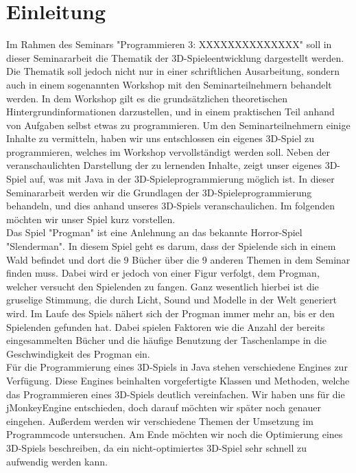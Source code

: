 \chapter{Einleitung}\label{ch:einleitung}
Im Rahmen des Seminars "Programmieren 3: XXXXXXXXXXXXXX" soll in dieser Seminararbeit die Thematik der 3D-Spieleentwicklung dargestellt werden. Die Thematik soll jedoch nicht nur in einer schriftlichen Ausarbeitung, sondern auch in einem sogenannten Workshop mit den Seminarteilnehmern behandelt werden. In dem Workshop gilt es die grundsätzlichen theoretischen Hintergrundinformationen darzustellen, und in einem praktischen Teil anhand von Aufgaben selbst etwas zu programmieren. Um den Seminarteilnehmern einige Inhalte zu vermitteln, haben wir uns entschlossen ein eigenes 3D-Spiel zu programmieren, welches im Workshop vervollständigt werden soll. Neben der veranschaulichten Darstellung der zu lernenden Inhalte, zeigt unser eigenes 3D-Spiel auf, was mit Java in der 3D-Spieleprogrammierung möglich ist. In dieser Seminararbeit werden wir die Grundlagen der 3D-Spieleprogrammierung behandeln, und dies anhand unseres 3D-Spiels veranschaulichen. Im folgenden möchten wir unser Spiel kurz vorstellen.\\

Das Spiel "Progman" ist eine Anlehnung an das bekannte Horror-Spiel "Slenderman". In diesem Spiel geht es darum, dass der Spielende sich in einem Wald befindet und dort die 9 Bücher über die 9 anderen Themen in dem Seminar finden muss. Dabei wird er jedoch von einer Figur verfolgt, dem Progman, welcher versucht den Spielenden zu fangen. Ganz wesentlich hierbei ist die gruselige Stimmung, die durch Licht, Sound und Modelle in der Welt generiert wird. Im Laufe des Spiels nähert sich der Progman immer mehr an, bis er den Spielenden gefunden hat. Dabei spielen Faktoren wie die Anzahl der bereits eingesammelten Bücher und die häufige Benutzung der Taschenlampe in die Geschwindigkeit des Progman ein. \\

Für die Programmierung eines 3D-Spiels in Java stehen verschiedene Engines zur Verfügung. Diese Engines beinhalten vorgefertigte Klassen und Methoden, welche das Programmieren eines 3D-Spiels deutlich vereinfachen. Wir haben uns für die jMonkeyEngine entschieden, doch darauf möchten wir später noch genauer eingehen. Außerdem werden wir verschiedene Themen der Umsetzung im Programmcode untersuchen. Am Ende möchten wir noch die Optimierung eines 3D-Spiels beschreiben, da ein nicht-optimiertes 3D-Spiel sehr schnell zu aufwendig werden kann.



